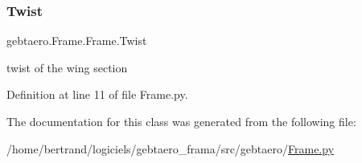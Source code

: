 \subsubsection{\texorpdfstring{Twist}{Twist}}
{\footnotesize\ttfamily gebtaero.\+Frame.\+Frame.\+Twist}



twist of the wing section 



Definition at line 11 of file Frame.\+py.



The documentation for this class was generated from the following file\+:\begin{DoxyCompactItemize}
\item 
/home/bertrand/logiciels/gebtaero\+\_\+frama/src/gebtaero/\hyperlink{_frame_8py}{Frame.\+py}\end{DoxyCompactItemize}
